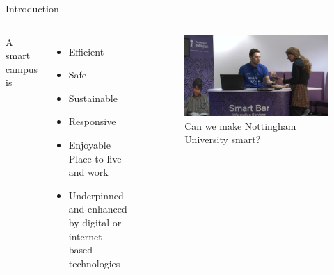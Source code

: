 \documentclass[18pt]{beamer}
\begin{document}
    \begin{frame}{Introduction}
        \begin{columns}
                A smart campus is
                \begin{itemize}
                    \item Efficient
                    \item Safe
                    \item Sustainable
                    \item Responsive
                    \item Enjoyable Place to live and work
                    \item Underpinned and enhanced by digital or internet based technologies
                \end{itemize} \cite{Misc:uonsmartcampus}
                \begin{figure}
                \includegraphics[width=0.99\columnwidth]{smart}
                \caption{Can we make Nottingham University smart?}
                \end{figure}
        \end{columns}
    \end{frame}
\end{document}
